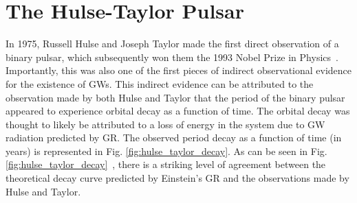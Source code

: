 
\section{The Hulse-Taylor Pulsar}

In 1975, Russell Hulse and Joseph Taylor made the first direct observation  of a binary pulsar, which subsequently won them the 1993 Nobel Prize in Physics~\cite{1975ApJ...195L..51H}. Importantly, this was also one of the first pieces of indirect observational evidence for the existence of \ac{GW}s. This indirect evidence can be attributed to the observation 
made by both Hulse and Taylor that the period of the binary pulsar 
appeared to experience orbital decay as a function of time. The orbital 
decay was thought to likely be attributed to a loss of energy in the 
system due to \ac{GW} radiation predicted by \ac{GR}. The observed period 
decay as a function of time (in years) is represented
in Fig. \ref{fig:hulse_taylor_decay}. As can be seen in Fig. \ref{fig:hulse_taylor_decay}~, there is a striking level of agreement 
between the theoretical decay curve predicted by Einstein's \ac{GR} and 
the observations made by Hulse and Taylor.

